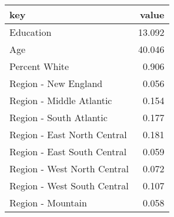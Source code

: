 \begin{tabular}{lr}
  \hline
key & value \\ 
  \hline
Education & 13.092 \\ 
  Age & 40.046 \\ 
  Percent White & 0.906 \\ 
  Region - New England & 0.056 \\ 
  Region - Middle Atlantic & 0.154 \\ 
  Region - South Atlantic & 0.177 \\ 
  Region - East North Central & 0.181 \\ 
  Region - East South Central & 0.059 \\ 
  Region - West North Central & 0.072 \\ 
  Region - West South Central & 0.107 \\ 
  Region - Mountain & 0.058 \\ 
   \hline
\end{tabular}
